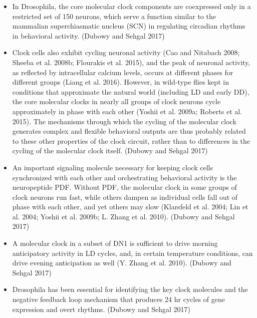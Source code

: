 \documentclass[11pt]{article}
\begin{document}
\begin{itemize}
    \item In Drosophila, the core molecular clock components are coexpressed only in a restricted
    set of 150 neurons, which serve a function similar to the mammalian superchiasmatic nucleus
    (SCN) in regulating circadian rhythms in behavioral activity.
    \parencite{dubowyCircadianRhythmsSleep2017} (Dubowy and Sehgal 2017)

    \item Clock cells also exhibit cycling neuronal activity (Cao and Nitabach 2008; Sheeba et al.
    2008b; Flourakis et al. 2015), and the peak of neuronal activity, as reflected by intracellular 
    calcium levels, occurs at different phases for different groups (Liang et al. 2016). However, in 
    wild-type flies kept in conditions that approximate the natural world (including LD and early DD), 
    the core molecular clocks in nearly all groups of clock neurons cycle approximately in phase with 
    each other (Yoshii
    et al. 2009a; Roberts et al. 2015). The mechanisms through which the cycling of the molecular clock 
    generates complex and flexible behavioral outputs are thus probably related to these other properties
    of the clock circuit, rather than to differences in the cycling of the molecular clock itself.
    \parencite{dubowyCircadianRhythmsSleep2017} (Dubowy and Sehgal 2017)

    \item An important signaling molecule necessary for keeping clock cells synchronized with each 
    other and orchestrating behavioral activity is the neuropeptide PDF.
    Without PDF, the molecular clock in some groups of clock neurons run fast, while others dampen 
    as individual cells fall out of phase with each other, and yet others may slow 
    (Klarsfeld et al. 2004; Lin et al. 2004; Yoshii et al. 2009b; L. Zhang et al. 2010).
    \parencite{dubowyCircadianRhythmsSleep2017} (Dubowy and Sehgal 2017)


    \item A molecular clock in a subset of DN1 is sufficient to drive morning anticipatory activity
    in LD cycles, and, in certain temperature conditions, can drive evening anticipation as well 
    (Y. Zhang et al. 2010).
    \parencite{dubowyCircadianRhythmsSleep2017} (Dubowy and Sehgal 2017)

    \item Drosophila has been essential for identifying the key clock molecules and the negative 
    feedback loop mechanism that produces 24 hr cycles of gene expression and overt rhythms.
    \parencite{dubowyCircadianRhythmsSleep2017} (Dubowy and Sehgal 2017)


\end{itemize}
\end{document}
